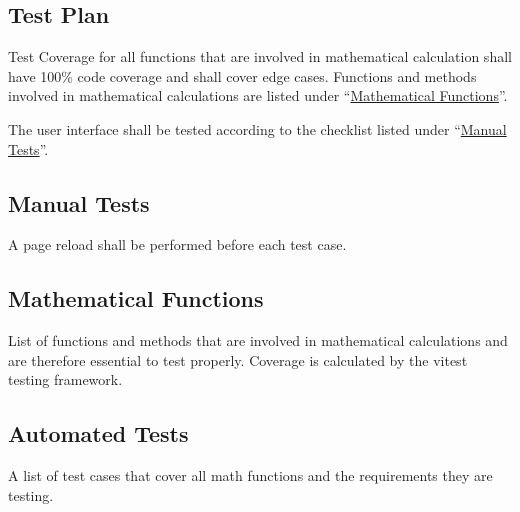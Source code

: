 \subsection{Test Plan}
Test Coverage for all functions that are involved in mathematical calculation shall have 100\% code coverage and shall cover edge cases. Functions and methods involved in mathematical calculations are listed under \enquote{\hyperref[tab:math_functions]{Mathematical Functions}}.

The user interface shall be tested according to the checklist listed under \enquote{\hyperref[tab:manual_tests]{Manual Tests}}. 

\subsection{Manual Tests}
A page reload shall be performed before each test case.


\newpage
\subsection{Mathematical Functions}

List of functions and methods that are involved in mathematical calculations and are therefore essential to test properly. Coverage is calculated by the {\ttfamily vitest} testing framework.

    
\newpage
\subsection{Automated Tests}
A list of test cases that cover all math functions and the requirements they are testing.
